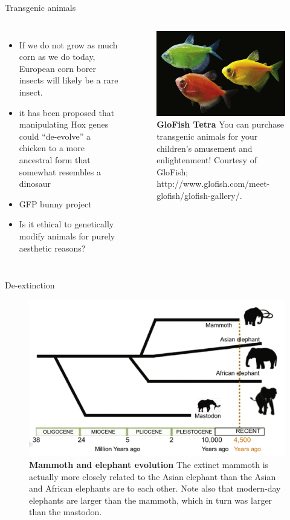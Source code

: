 \documentclass[ignorenonframetext,aspectratio=169]{beamer}
\begin{document}
\begin{frame}{Transgenic animals}
\protect\hypertarget{transgenic-animals}{}

\begin{columns}[T,onlytextwidth]
  
  \begin{itemize}
    \item If we do not grow as much corn as we do today, European corn borer insects will likely be a rare insect.
    \item it has been proposed that manipulating Hox genes could “de-evolve” a chicken to a more ancestral form that somewhat resembles a dinosaur
    \item GFP bunny project
    \item Is it ethical to genetically modify animals for purely aesthetic reasons?
  \end{itemize}
  

\begin{figure}
\includegraphics[width=0.5\linewidth]{../images/glofish_tetra} \caption{\textbf{GloFish Tetra} \newline You can purchase transgenic animals for your children's amusement and enlightenment! Courtesy of GloFish; http://www.glofish.com/meet-glofish/glofish-gallery/.}\label{fig:glofish-tetra}
\end{figure}

\end{columns}

\end{frame}

\begin{frame}{De-extinction}
\protect\hypertarget{de-extinction}{}

\begin{figure}
\includegraphics[width=0.45\linewidth]{../images/mammoth_deextinction} \caption{\textbf{Mammoth and elephant evolution} The extinct mammoth is actually more closely related to the Asian elephant than the Asian and African elephants are to each other. Note also that modern-day elephants are larger than the mammoth, which in turn was larger than the mastodon.}\label{fig:mammoth-resurrection}
\end{figure}

\end{frame}
\end{document}
